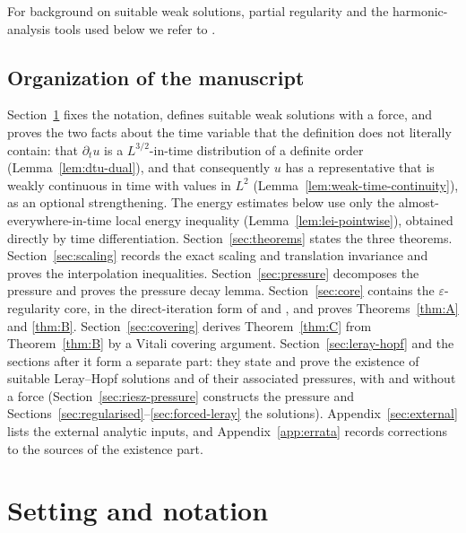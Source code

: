 \documentclass[11pt,reqno]{amsart}
\begin{document}
For background on suitable weak solutions, partial regularity and the
harmonic-analysis tools used below we refer to
\cite{Adams1975,CKN1982,ColomboDeLellisMassaccesi2018,DiestelUhl1977,Giaquinta1983,GilbargTrudinger2001,Kukavica2008,LadyzhenskayaSeregin1999,LadyzhenskayaSolonnikovUraltseva1968,LemarieRieusset2002,LemarieRieusset2016,Lin1998,Mattila1995,OLeary2003,RobinsonRodrigoSadowski2016,Scheffer1977,Stein1970,Stein1993,Temam1977,Tsai2018,Vasseur2007}.

\subsection*{Organization of the manuscript}
Section~\ref{sec:setting} fixes the notation, defines suitable weak solutions
with a force, and proves the two facts about the time variable that the
definition does not literally contain: that $\partial_{t}u$ is a
$L^{3/2}$-in-time distribution of a definite order (Lemma~\ref{lem:dtu-dual}),
and that consequently $u$ has a representative that is weakly continuous in time
with values in $L^{2}$ (Lemma~\ref{lem:weak-time-continuity}), as an optional strengthening. The energy estimates below use only the
almost-everywhere-in-time local energy inequality
(Lemma~\ref{lem:lei-pointwise}), obtained directly by time differentiation. Section~\ref{sec:theorems} states the three
theorems. Section~\ref{sec:scaling} records the exact scaling and translation
invariance and proves the interpolation inequalities.
Section~\ref{sec:pressure} decomposes the pressure and proves the pressure decay
lemma. Section~\ref{sec:core} contains the
$\varepsilon$-regularity core, in the direct-iteration form of
\cite{Kukavica2008} and \cite[\S13.8--13.9]{LemarieRieusset2016}, and proves
Theorems~\ref{thm:A} and \ref{thm:B}. Section~\ref{sec:covering} derives
Theorem~\ref{thm:C} from Theorem~\ref{thm:B} by a Vitali covering argument.
Section~\ref{sec:leray-hopf} and the sections after it form a separate part:
they state and prove the existence of suitable Leray--Hopf solutions and of
their associated pressures, with and without a force
(Section~\ref{sec:riesz-pressure} constructs the pressure and
Sections~\ref{sec:regularised}--\ref{sec:forced-leray} the solutions).
Appendix~\ref{sec:external} lists the external analytic inputs, and
Appendix~\ref{app:errata} records corrections to the sources of the existence
part.

\section{Setting and notation}\label{sec:setting}
\end{document}
